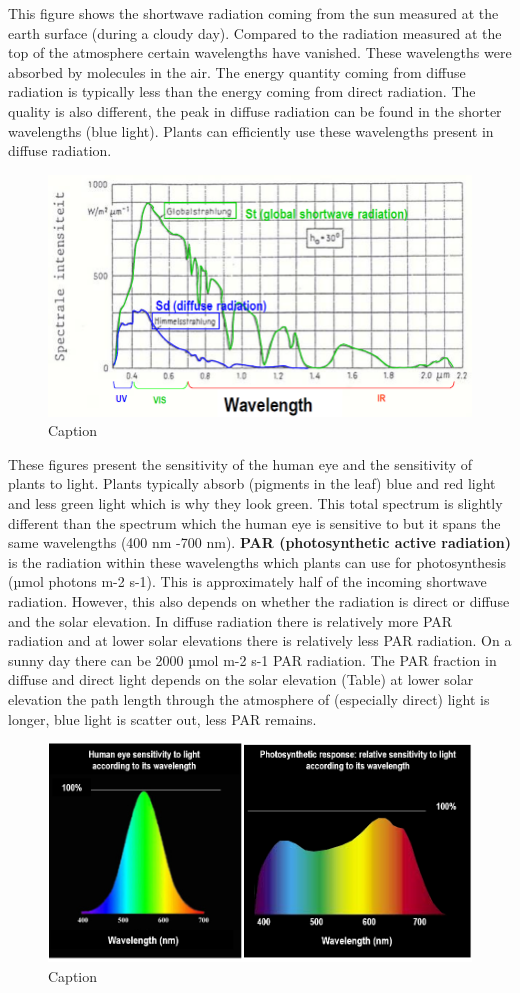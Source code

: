 \documentclass[oneside]{book}
\begin{document}
This figure shows the shortwave radiation coming from the sun measured
at the earth surface (during a cloudy day). Compared to the radiation
measured at the top of the atmosphere certain wavelengths have vanished.
These wavelengths were absorbed by molecules in the air. The energy
quantity coming from diffuse radiation is typically less than the energy
coming from direct radiation. The quality is also different, the peak in
diffuse radiation can be found in the shorter wavelengths (blue light).
Plants can efficiently use these wavelengths present in diffuse
radiation.

\begin{figure}

{\centering \includegraphics[width=0.5\linewidth]{figures/Figure128} 

}

\caption{Caption}\label{fig:Diffuse2}
\end{figure}

These figures present the sensitivity of the human eye and the
sensitivity of plants to light. Plants typically absorb (pigments in the
leaf) blue and red light and less green light which is why they look
green. This total spectrum is slightly different than the spectrum which
the human eye is sensitive to but it spans the same wavelengths (400 nm
-700 nm). \textbf{PAR (photosynthetic active radiation)} is the
radiation within these wavelengths which plants can use for
photosynthesis (µmol photons m-2 s-1). This is approximately half of the
incoming shortwave radiation. However, this also depends on whether the
radiation is direct or diffuse and the solar elevation. In diffuse
radiation there is relatively more PAR radiation and at lower solar
elevations there is relatively less PAR radiation. On a sunny day there
can be 2000 µmol m-2 s-1 PAR radiation. The PAR fraction in diffuse and
direct light depends on the solar elevation (Table) at lower solar
elevation the path length through the atmosphere of (especially direct)
light is longer, blue light is scatter out, less PAR remains.

\begin{figure}

{\centering \includegraphics[width=0.5\linewidth]{figures/Figure129} 

}

\caption{Caption}\label{fig:PAR}
\end{figure}
\end{document}
